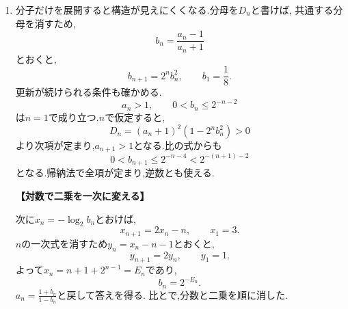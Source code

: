 \begin{enumerate}[label=\textbf{問\arabic*.},leftmargin=3.8em,format=\bookitemlink{practice-advanced}{solution}{problem}]
                \noindent \textbf{【別解】}\\
                を取らずに,積と商を作っても分離できる.
                \[
                  P_n=a_nb_n,\qquad R_n=\frac{a_n}{b_n}
                \]
                とおくと,
\BookMathLayout{
\[
\begin{aligned}
P_{n+1}&=P_n^3,\quad P_1=4,\\
R_{n+1}&=2^{4n+2}R_n,\quad R_1=1.
\end{aligned}
\]
}{
\[
\begin{aligned}
P_{n+1}&=P_n^3,\quad P_1=4,\\
R_{n+1}&=2^{4n+2}R_n,\quad R_1=1.
\end{aligned}
\]
}
                よって,
                \[
                  P_n=2^{\,2\cdot3^{n-1}},\qquad
                  R_n=2^{\,2(n^2-1)}.
                \]
                正値を使って$a_n=\sqrt{P_nR_n}$,\, $\displaystyle b_n=\sqrt{\frac{P_n}{R_n}}$と戻せば同じ答えになる.の和と差は,元のの積と商に対応する.
          \item 分子だけを展開すると構造が見えにくくなる.分母を$D_n$と書けば,
\BookMathLayout{\[
                 a_{n+1}-1=\frac{2^{n+1}(a_n-1)^2}{D_n},
                 \qquad
                 a_{n+1}+1=\frac{2(a_n+1)^2}{D_n}.
                \]}{
\[
\begin{aligned}
a_{n+1}-1&=\frac{2^{n+1}(a_n-1)^2}{D_n},\\
a_{n+1}+1&=\frac{2(a_n+1)^2}{D_n}.
\end{aligned}
\]
}
                共通する分母を消すため,
                \[
                  b_n=\frac{a_n-1}{a_n+1}
                \]
                とおくと,
                \[
                  b_{n+1}=2^n b_n^2,\qquad b_1=\frac18.
                \]
                更新が続けられる条件も確かめる.
                \[
                  a_n>1,\qquad 0<b_n\le2^{-n-2}
                \]
                は$n=1$で成り立つ.$n$で仮定すると,
                \[
                  D_n=(a_n+1)^2(1-2^nb_n^2)>0
                \]
                より次項が定まり,$a_{n+1}>1$となる.比の式からも
                \[
                  0<b_{n+1}\le2^{-n-4}<2^{-(n+1)-2}
                \]
                となる.帰納法で全項が定まり,逆数とも使える.

                \par\smallskip\noindent\textbf{【対数で二乗を一次に変える】}\par\nopagebreak[4]
                次に$x_n=-\log_2b_n$とおけば,
                \[
                  x_{n+1}=2x_n-n,\qquad x_1=3.
                \]
                $n$の一次式を消すため$y_n=x_n-n-1$とおくと,
                \[
                  y_{n+1}=2y_n,\qquad y_1=1.
                \]
                よって$x_n=n+1+2^{n-1}=E_n$であり,
                \[
                  b_n=2^{-E_n}.
                \]
                $\displaystyle a_n=\frac{1+b_n}{1-b_n}$と戻して答えを得る.
                比とで,分数と二乗を順に消した.


\end{enumerate}
